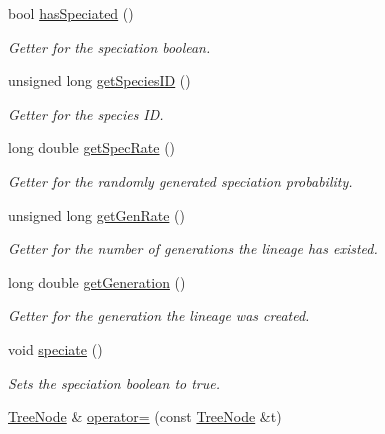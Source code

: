 \begin{DoxyCompactItemize}
bool \hyperlink{class_tree_node_a1c6376914155dee34c708a9daa664f81}{has\+Speciated} ()
\begin{DoxyCompactList}\small\item\em Getter for the speciation boolean. \end{DoxyCompactList}\item 
unsigned long \hyperlink{class_tree_node_a923a5ffbd66e3823a816fb9d76555eaf}{get\+Species\+ID} ()
\begin{DoxyCompactList}\small\item\em Getter for the species ID. \end{DoxyCompactList}\item 
long double \hyperlink{class_tree_node_af43059aa1fd45e75c9e48ef8f67fa3b1}{get\+Spec\+Rate} ()
\begin{DoxyCompactList}\small\item\em Getter for the randomly generated speciation probability. \end{DoxyCompactList}\item 
unsigned long \hyperlink{class_tree_node_ac4e7efffacf32905d73c83b9092232b0}{get\+Gen\+Rate} ()
\begin{DoxyCompactList}\small\item\em Getter for the number of generations the lineage has existed. \end{DoxyCompactList}\item 
long double \hyperlink{class_tree_node_a55ff42f83d75a9a1fae09605b3e2027f}{get\+Generation} ()
\begin{DoxyCompactList}\small\item\em Getter for the generation the lineage was created. \end{DoxyCompactList}\item 
void \hyperlink{class_tree_node_a65a021122e06071f6f127be3a0171518}{speciate} ()\hypertarget{class_tree_node_a65a021122e06071f6f127be3a0171518}{}\label{class_tree_node_a65a021122e06071f6f127be3a0171518}

\begin{DoxyCompactList}\small\item\em Sets the speciation boolean to true. \end{DoxyCompactList}\item 
\hyperlink{class_tree_node}{Tree\+Node} \& \hyperlink{class_tree_node_af362bf557fa6af455f6bac31c4f0356a}{operator=} (const \hyperlink{class_tree_node}{Tree\+Node} \&t)
\end{DoxyCompactItemize}
